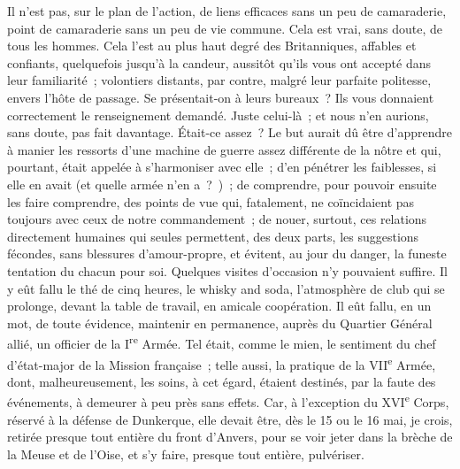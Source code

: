 \documentclass[french,twoside]{book} %
\begin{document}
Il n’est pas, sur le plan de l’action, de liens efficaces sans un peu de camaraderie, point de camaraderie sans un peu de vie commune. Cela est vrai, sans doute, de tous les hommes. Cela l’est au plus haut degré des Britanniques, affables et confiants, quelquefois jusqu’à la candeur, aussitôt qu’ils vous   ont accepté dans leur familiarité ; volontiers distants, par contre, malgré leur parfaite politesse, envers l’hôte de passage. Se présentait-on à leurs bureaux ? Ils vous donnaient correctement le renseignement demandé. Juste celui-là ; et nous n’en aurions, sans doute, pas fait davantage. Était-ce assez ? Le but aurait dû être d’apprendre à manier les ressorts d’une machine de guerre assez différente de la nôtre et qui, pourtant, était appelée à s’harmoniser avec elle ; d’en pénétrer les faiblesses, si elle en avait (et quelle armée n’en a ? ) ; de comprendre, pour pouvoir ensuite les faire comprendre, des points de vue qui, fatalement, ne coïncidaient pas toujours avec ceux de notre commandement ; de nouer, surtout, ces relations directement humaines qui seules permettent, des deux parts, les suggestions fécondes, sans blessures d’amour-propre, et évitent, au jour du danger, la funeste tentation du chacun pour soi. Quelques visites d’occasion n’y pouvaient suffire. Il y eût fallu le thé de cinq heures, le whisky and soda, l’atmosphère de club qui se prolonge, devant la table de travail, en amicale coopération. Il eût fallu, en un mot, de toute évidence, maintenir en permanence, auprès du Quartier Général allié, un officier de la I\textsuperscript{re} Armée. Tel était, comme le mien, le sentiment du chef d’état-major de la Mission française ; telle aussi, la pratique de la VII\textsuperscript{e} Armée, dont, malheureusement, les soins, à cet égard, étaient destinés, par la faute des événements, à demeurer à peu près sans effets. Car, à l’exception du XVI\textsuperscript{e} Corps, réservé à la défense de Dunkerque, elle devait être, dès le 15 ou le 16 mai, je crois, retirée presque tout entière du front d’Anvers, pour se voir jeter dans la brèche de la Meuse et de l’Oise, et s’y faire, presque tout entière, pulvériser.\par
\end{document}
